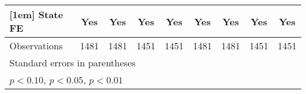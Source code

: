 {\begin{longtable}{l*{8}{c}}
[1em]
State FE            &         Yes         &         Yes         &         Yes         &         Yes         &         Yes         &         Yes         &         Yes         &         Yes         \\
\hline
Observations        &        1481         &        1481         &        1451         &        1451         &        1481         &        1481         &        1451         &        1451         \\
\hline\hline
\multicolumn{9}{l}{\footnotesize Standard errors in parentheses}\\
\multicolumn{9}{l}{\footnotesize \sym{*} \(p<0.10\), \sym{**} \(p<0.05\), \sym{***} \(p<0.01\)}\\
\end{longtable}
}

